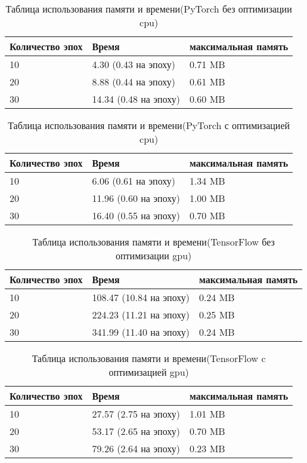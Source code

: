 \documentclass[a4paper,12pt,titlepage,final]{article}
\begin{document}
\begin{table}[H]
\centering
\begin{tabular}{|p{5.4cm}|p{3.8cm}|p{3.8cm}|}
\hline 
Количество эпох & Время & максимальная память\\ 
\hline
10 & 4.30 (0.43 на эпоху) & 0.71 MB \\ [1.5ex]
\hline
20 & 8.88 (0.44 на эпоху) & 0.61 MB \\ [1.5ex]
\hline
30 & 14.34 (0.48 на эпоху) & 0.60 MB \\ [1.5ex]
\hline
\end{tabular}
\caption{Таблица использования памяти и времени(PyTorch без оптимизации cpu)}
\label{table_mem1}
\end{table}

\begin{table}[H]
\centering
\begin{tabular}{|p{5.4cm}|p{3.8cm}|p{3.8cm}|}
\hline 
Количество эпох & Время & максимальная память\\ 
\hline
10 & 6.06 (0.61 на эпоху) & 1.34 MB \\ [1.5ex]
\hline
20 & 11.96 (0.60 на эпоху) & 1.00 MB \\ [1.5ex]
\hline
30 & 16.40 (0.55 на эпоху) & 0.70 MB \\ [1.5ex]
\hline
\end{tabular}
\caption{Таблица использования памяти и времени(PyTorch с оптимизацией cpu)}
\label{table_mem1}
\end{table}

\begin{table}[H]
\centering
\begin{tabular}{|p{5.4cm}|p{3.8cm}|p{3.8cm}|}
\hline 
Количество эпох & Время & максимальная память\\ 
\hline
10 & 108.47 (10.84 на эпоху) & 0.24 MB \\ [1.5ex]
\hline
20 & 224.23 (11.21 на эпоху) & 0.25 MB \\ [1.5ex]
\hline
30 & 341.99 (11.40 на эпоху) & 0.24 MB \\ [1.5ex]
\hline
\end{tabular}
\caption{Таблица использования памяти и времени(TensorFlow без оптимизации gpu)}
\label{table_mem1}
\end{table}

\begin{table}[H]
\centering
\begin{tabular}{|p{5.4cm}|p{3.8cm}|p{3.8cm}|}
\hline 
Количество эпох & Время & максимальная память\\ 
\hline
10 & 27.57 (2.75 на эпоху) & 1.01 MB \\ [1.5ex]
\hline
20 & 53.17 (2.65 на эпоху) & 0.70 MB \\ [1.5ex]
\hline
30 & 79.26 (2.64 на эпоху) & 0.23 MB \\ [1.5ex]
\hline
\end{tabular}
\caption{Таблица использования памяти и времени(TensorFlow c оптимизацией gpu)}
\label{table_mem1}
\end{table}
\end{document}
